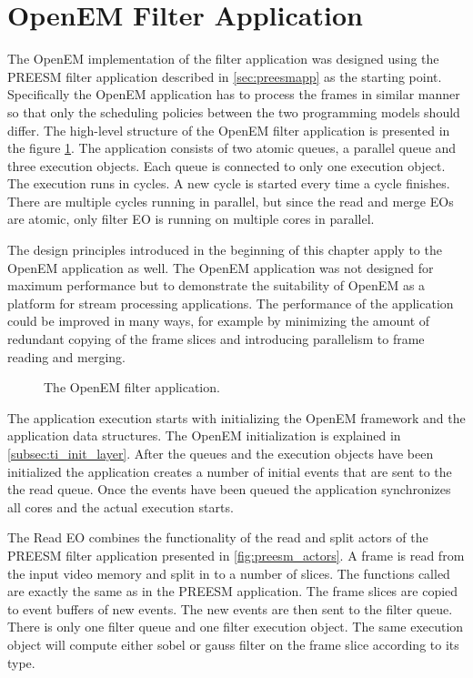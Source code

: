 \section{OpenEM Filter Application}
\label{sec:oemapp}
The OpenEM implementation of the filter application was designed using the PREESM filter application described in \ref{sec:preesmapp} as the starting point. Specifically the OpenEM application has to process the frames in similar manner so that only the scheduling policies between the two programming models should differ. The high-level structure of the OpenEM filter application is presented in the figure \ref{fig:openem_flow}. The application consists of two atomic queues, a parallel queue and three execution objects. Each queue is connected to only one execution object. The execution runs in cycles. A new cycle is started every time a cycle finishes. There are multiple cycles running in parallel, but since the read and merge EOs are atomic, only filter EO is running on multiple cores in parallel.

The design principles introduced in the beginning of this chapter apply to the OpenEM application as well. The OpenEM application was not designed for maximum performance but to demonstrate the suitability of OpenEM as a platform for stream processing applications. The performance of the application could be improved in many ways, for example by minimizing the amount of redundant copying of the frame slices and introducing parallelism to frame reading and merging.  

\begin{figure}[h!]
    \begin{center}
        
        \caption{The OpenEM filter application.}
        \label{fig:openem_flow}
    \end{center}
\end{figure}

The application execution starts with initializing the OpenEM framework and the application data structures. The OpenEM initialization is explained in \ref{subsec:ti_init_layer}. After the queues and the execution objects have been initialized the application creates a number of initial events that are sent to the the read queue. Once the events have been queued the application synchronizes all cores and the actual execution starts.

The Read EO combines the functionality of the read and split actors of the PREESM filter application presented in \ref{fig:preesm_actors}. A frame is read from the input video memory and split in to a number of slices. The functions called are exactly the same as in the PREESM application. The frame slices are copied to event buffers of new events. The new events are then sent to the filter queue. There is only one filter queue and one filter execution object. The same execution object will compute either sobel or gauss filter on the frame slice according to its type.


